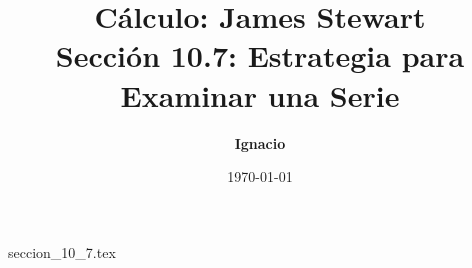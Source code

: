 \documentclass[11pt,spanish,oneside]{report}
\title{\textbf{Cálculo: James Stewart} \\ \Large Sección 10.7: Estrategia para Examinar una Serie}
\author{\textbf{Ignacio}}
\date{\today}
\begin{document}
\maketitle

{seccion_10_7.tex}
\end{document}
